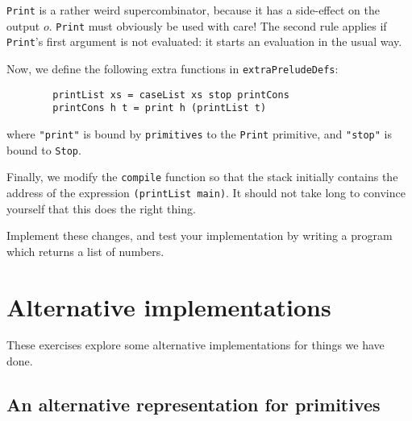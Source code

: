 \mbox{\tt Print} is a rather weird supercombinator,
because it has a side-effect
on the output $o$.  \mbox{\tt Print} must obviously be used with care!
The second rule applies if \mbox{\tt Print}'s first argument is not evaluated: it
starts an evaluation in the usual way.
\label{rule:print-eval}

Now, we define the following extra functions in \mbox{\tt extraPreludeDefs}:
\begin{verbatim}
        printList xs = caseList xs stop printCons
        printCons h t = print h (printList t)
\end{verbatim}
where \mbox{\tt "print"} is bound by \mbox{\tt primitives} to the \mbox{\tt Print} primitive,
and \mbox{\tt "stop"} is bound to \mbox{\tt Stop}.

Finally, we modify the \mbox{\tt compile} function so that the stack initially contains
the address of the expression \mbox{\tt (printList\ main)}.
It should not take long to convince yourself that this does the right
thing.

\begin{exercise}
Implement these changes, and test your implementation by writing a program
which returns a list of numbers.
\end{exercise}

\section{Alternative implementations\advanced}

These exercises explore some alternative implementations for things we have
done.

\subsection{An alternative representation for primitives}
\label{sect:ti:alternative-data}

